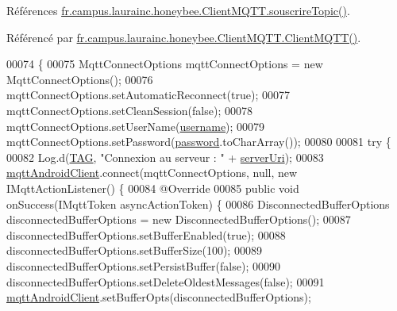 Références \hyperlink{classfr_1_1campus_1_1laurainc_1_1honeybee_1_1_client_m_q_t_t_a4c5ae1bb188b2f3c770ab6112b7d8590}{fr.\+campus.\+laurainc.\+honeybee.\+Client\+M\+Q\+T\+T.\+souscrire\+Topic()}.



Référencé par \hyperlink{classfr_1_1campus_1_1laurainc_1_1honeybee_1_1_client_m_q_t_t_a98cc7dce4cade9ffacfa462fe2f97088}{fr.\+campus.\+laurainc.\+honeybee.\+Client\+M\+Q\+T\+T.\+Client\+M\+Q\+T\+T()}.


\begin{DoxyCode}
00074                             \{
00075         MqttConnectOptions mqttConnectOptions = \textcolor{keyword}{new} MqttConnectOptions();
00076         mqttConnectOptions.setAutomaticReconnect(\textcolor{keyword}{true});
00077         mqttConnectOptions.setCleanSession(\textcolor{keyword}{false});
00078         mqttConnectOptions.setUserName(\hyperlink{classfr_1_1campus_1_1laurainc_1_1honeybee_1_1_client_m_q_t_t_ab0ba59ea8b9ae85d9436fbd2e96d2e8a}{username});
00079         mqttConnectOptions.setPassword(\hyperlink{classfr_1_1campus_1_1laurainc_1_1honeybee_1_1_client_m_q_t_t_a68fea868dcd85de576fb728aadcceed7}{password}.toCharArray());
00080 
00081         \textcolor{keywordflow}{try} \{
00082             Log.d(\hyperlink{classfr_1_1campus_1_1laurainc_1_1honeybee_1_1_client_m_q_t_t_a378324f705f8d7870c5f7be0cea02890}{TAG}, \textcolor{stringliteral}{"Connexion au serveur : "} + \hyperlink{classfr_1_1campus_1_1laurainc_1_1honeybee_1_1_client_m_q_t_t_acc6543bf073de1b41fae396d8c0cf83d}{serverUri});
00083             \hyperlink{classfr_1_1campus_1_1laurainc_1_1honeybee_1_1_client_m_q_t_t_a587a9b6c785448cf3e37dc92bcac7961}{mqttAndroidClient}.connect(mqttConnectOptions, null, \textcolor{keyword}{new} IMqttActionListener() 
      \{
00084                 @Override
00085                 \textcolor{keyword}{public} \textcolor{keywordtype}{void} onSuccess(IMqttToken asyncActionToken) \{
00086                     DisconnectedBufferOptions disconnectedBufferOptions = \textcolor{keyword}{new} DisconnectedBufferOptions();
00087                     disconnectedBufferOptions.setBufferEnabled(\textcolor{keyword}{true});
00088                     disconnectedBufferOptions.setBufferSize(100);
00089                     disconnectedBufferOptions.setPersistBuffer(\textcolor{keyword}{false});
00090                     disconnectedBufferOptions.setDeleteOldestMessages(\textcolor{keyword}{false});
00091                     \hyperlink{classfr_1_1campus_1_1laurainc_1_1honeybee_1_1_client_m_q_t_t_a587a9b6c785448cf3e37dc92bcac7961}{mqttAndroidClient}.setBufferOpts(disconnectedBufferOptions);

\end{DoxyCode}
